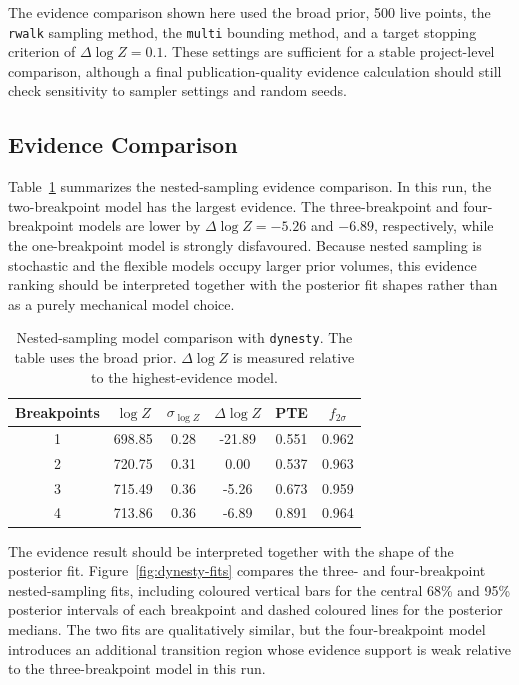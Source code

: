 \documentclass{article}
\numberwithin{equation}{section}
\begin{document}
The evidence comparison shown here used the broad prior, 500 live points, the \texttt{rwalk} sampling method, the \texttt{multi} bounding method, and a target stopping criterion of $\Delta\log Z = 0.1$. These settings are sufficient for a stable project-level comparison, although a final publication-quality evidence calculation should still check sensitivity to sampler settings and random seeds.

\subsection{Evidence Comparison}

Table~\ref{tab:dynesty-evidence} summarizes the nested-sampling evidence comparison. In this run, the two-breakpoint model has the largest evidence. The three-breakpoint and four-breakpoint models are lower by $\Delta\log Z=-5.26$ and $-6.89$, respectively, while the one-breakpoint model is strongly disfavoured. Because nested sampling is stochastic and the flexible models occupy larger prior volumes, this evidence ranking should be interpreted together with the posterior fit shapes rather than as a purely mechanical model choice.

\begin{table}[H]
\centering
\caption{Nested-sampling model comparison with \texttt{dynesty}. The table uses the broad prior. $\Delta\log Z$ is measured relative to the highest-evidence model.}
\label{tab:dynesty-evidence}
\begin{tabular}{cccccc}
\toprule
Breakpoints & $\log Z$ & $\sigma_{\log Z}$ & $\Delta\log Z$ & PTE & $f_{2\sigma}$ \\
\midrule
1 & 698.85 & 0.28 & -21.89 & 0.551 & 0.962 \\
2 & 720.75 & 0.31 & 0.00 & 0.537 & 0.963 \\
3 & 715.49 & 0.36 & -5.26 & 0.673 & 0.959 \\
4 & 713.86 & 0.36 & -6.89 & 0.891 & 0.964 \\
\bottomrule
\end{tabular}
\end{table}

The evidence result should be interpreted together with the shape of the posterior fit. Figure~\ref{fig:dynesty-fits} compares the three- and four-breakpoint nested-sampling fits, including coloured vertical bars for the central 68\% and 95\% posterior intervals of each breakpoint and dashed coloured lines for the posterior medians. The two fits are qualitatively similar, but the four-breakpoint model introduces an additional transition region whose evidence support is weak relative to the three-breakpoint model in this run.
\end{document}
